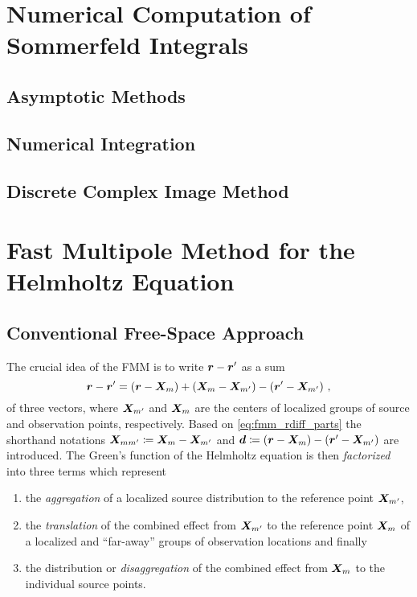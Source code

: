 \section{Numerical Computation of Sommerfeld Integrals}

\subsection{Asymptotic Methods}

\subsection{Numerical Integration}

\subsection{Discrete Complex Image Method}









\section{Fast Multipole Method for the Helmholtz Equation}

\subsection{Conventional Free-Space Approach}

The crucial idea of the \ac{FMM} is to write $\rdiff$ as a sum
\begin{equation}\label{eq:fmm_rdiff_parts}
	\rdiff =
	\left( \robs - \fmmObsGroupCenter              \right) +
	\left( \fmmObsGroupCenter - \fmmSrcGroupCenter \right) -
	\left( \rsrc - \fmmSrcGroupCenter              \right) \, ,
\end{equation}
of three vectors, where $\fmmSrcGroupCenter$ and $\fmmObsGroupCenter$ are the
centers of localized groups of source and observation points, respectively.
Based on \eqref{eq:fmm_rdiff_parts} the shorthand notations 
$\fmmDiffGroupCenters \coloneqq \fmmObsGroupCenter - \fmmSrcGroupCenter$
and 
$\pvec{d} \coloneqq \left( \robs - \fmmObsGroupCenter \right) - \left( \rsrc - \fmmSrcGroupCenter \right)$
are introduced.
The Green's function of the Helmholtz equation is then \emph{factorized} into
three terms which represent
\begin{enumerate}
	\item the \emph{aggregation} of a localized source distribution to the
	reference point $\fmmSrcGroupCenter$, 
	\item the \emph{translation} of the combined effect from
	$\fmmSrcGroupCenter$ to the reference point $\fmmObsGroupCenter$ of a
	localized and \enquote{far-away} groups of observation locations
	and finally
	\item the distribution or \emph{disaggregation} of the combined effect from
	$\fmmObsGroupCenter$ to the individual source points.
\end{enumerate}


